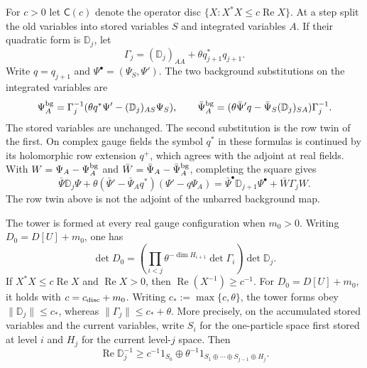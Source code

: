 \documentclass[11pt,letterpaper,reqno]{amsart}
\makeatletter
\theoremstyle{definition}
\newcommand{\ms@minorstart}{%
  \pushQED{\qed}\renewcommand{\qedsymbol}{$\blacksquare$}}
\newenvironment{lemma}[1][]{\ms@minorstart\ms@lemma[#1]}
  {\popQED\endms@lemma}
\theoremstyle{remark}
\makeatother
\begin{document}
For $c>0$ let $\mathsf C(c)$ denote the operator disc
$\{X:X^*X\le c\operatorname{Re}X\}$.
At a step split the old variables into stored variables $S$ and
integrated variables $A$.  If their quadratic form is $\mathbb D_j$,
let
\[
 \Gamma_j=(\mathbb D_j)_{AA}+\theta q_{j+1}^*q_{j+1}.
\]
Write $q=q_{j+1}$ and $\Psi^\bullet=(\Psi_S,\Psi')$. The two
background substitutions on the integrated variables are
\[
 \Psi_A^{\rm bg}=\Gamma_j^{-1}
       (\theta q^*\Psi'-(\mathbb D_j)_{AS}\Psi_S),\qquad
 \bar\Psi_A^{\rm bg}=
       (\theta\bar\Psi' q-\bar\Psi_S(\mathbb D_j)_{SA})\Gamma_j^{-1}.
\]
The stored variables are unchanged. The second substitution is
the row twin of the first. On complex gauge fields the symbol
$q^*$ in these formulas is continued by its holomorphic row
extension $q^+$, which agrees with the adjoint at real fields.
With $W=\Psi_A-\Psi_A^{\rm bg}$ and
$\bar W=\bar\Psi_A-\bar\Psi_A^{\rm bg}$, completing the square gives
\[
 \bar\Psi\mathbb D_j\Psi+
 \theta(\bar\Psi'-\bar\Psi_Aq^*)(\Psi'-q\Psi_A)
 =\bar\Psi^\bullet\mathbb D_{j+1}\Psi^\bullet+
                          \bar W\Gamma_jW.
\]
The row twin above is not the adjoint of the unbarred background map.

\begin{lemma}[Exact factorization]\label{C-397-12}
The tower is formed at every real gauge configuration when $m_0>0$.
Writing $D_0=D[U]+m_0$, one has
\[
 \det D_0=\left(\prod_{i<j}\theta^{-\dim H_{i+1}}
                      \det\Gamma_i\right)\det\mathbb D_j.
\]
If $X^*X\le c\operatorname{Re}X$ and
$\operatorname{Re}X>0$, then $\operatorname{Re}(X^{-1})\ge c^{-1}$.
For $D_0=D[U]+m_0$, it holds with $c=c_{\rm disc}+m_0$.
Writing $c_*:=\max\{c,\theta\}$, the tower forms obey
$\|\mathbb D_j\|\le c_*$, whereas
$\|\Gamma_j\|\le c_*+\theta$.
More precisely, on the accumulated stored variables and the
current variables, write $S_i$ for the one-particle space first
stored at level $i$ and $H_j$ for the current level-$j$ space. Then
\[
 \operatorname{Re}\mathbb D_j^{-1}
 \ge c^{-1}1_{S_0}\oplus
        \theta^{-1}1_{S_1\oplus\cdots\oplus S_{j-1}\oplus H_j}.
\]
\end{lemma}
\end{document}
